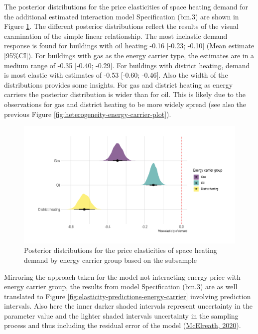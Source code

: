 \documentclass[12pt,twoside]{reedthesis}
\begin{document}
The posterior distributions for the price elasticities of space heating demand for the additional estimated interaction model Specification (bm.3) are shown in Figure \ref{fig:posterior-distribution-interaction}. The different posterior distributions reflect the results of the visual examination of the simple linear relationship. The most inelastic demand response is found for buildings with oil heating -0.16 {[}-0.23; -0.10{]} (Mean estimate {[}95\%CI{]}). For buildings with gas as the energy carrier type, the estimates are in a medium range of -0.35 {[}-0.40; -0.29{]}. For buildings with district heating, demand is most elastic with estimates of -0.53 {[}-0.60; -0.46{]}. Also the width of the distributions provides some insights. For gas and district heating as energy carriers the posterior distribution is wider than for oil. This is likely due to the observations for gas and district heating to be more widely spread (see also the previous Figure \ref{fig:heterogeneity-energy-carrier-plot}).
\begin{figure}

{\centering \includegraphics[width=1\linewidth]{figure/posterior-distribution-interaction} 

}

\caption{Posterior distributions for the price elasticities of space heating demand by energy carrier group based on the subsample}\label{fig:posterior-distribution-interaction}
\end{figure}
Mirroring the approach taken for the model not interacting energy price with energy carrier group, the results from model Specification (bm.3) are as well translated to Figure \ref{fig:elasticity-predictions-energy-carrier} involving prediction intervals. Also here the inner darker shaded intervals represent uncertainty in the parameter value and the lighter shaded intervals uncertainty in the sampling process and thus including the residual error of the model (\protect\hyperlink{ref-mcelreath20}{McElreath, 2020}).
\end{document}
